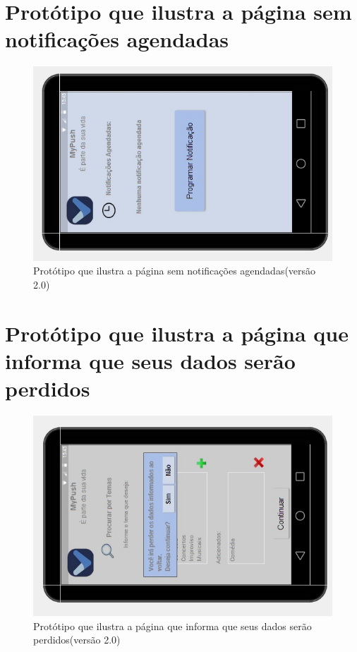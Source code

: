 \begin{apendicesenv}
      \section*{Protótipo que ilustra a página sem notificações agendadas}

    \begin{figure}[!htbp]
      \centering
      \includegraphics[scale=0.5, angle=-90]{editaveis/figuras/prototipo_alta_fidelidade_v2/2_9}
      \caption{Protótipo que ilustra a página sem notificações agendadas(versão 2.0)}
      \label{v2}
    \end{figure}
    
      \section*{Protótipo que ilustra a página que informa que seus dados serão perdidos}

    \begin{figure}[!htbp]
      \centering
      \includegraphics[scale=0.5, angle=-90]{editaveis/figuras/prototipo_alta_fidelidade_v2/2_10}
      \caption{Protótipo que ilustra a página que informa que seus dados serão perdidos(versão 2.0)}
      \label{v2}
    \end{figure}
    

\end{apendicesenv}
